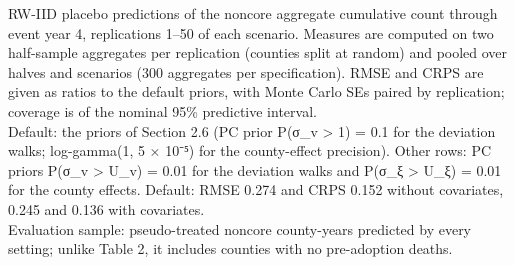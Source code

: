 \begin{table}
\begin{minipage}{\linewidth}
RW-IID placebo predictions of the noncore aggregate cumulative count through event year 4, replications 1–50 of each scenario. Measures are computed on two half-sample aggregates per replication (counties split at random) and pooled over halves and scenarios (300 aggregates per specification). RMSE and CRPS are given as ratios to the default priors, with Monte Carlo SEs paired by replication; coverage is of the nominal 95\% predictive interval.\\
Default: the priors of Section 2.6 (PC prior P(σ\_v > 1) = 0.1 for the deviation walks; log-gamma(1, 5 × 10⁻⁵) for the county-effect precision). Other rows: PC priors P(σ\_v > U\_v) = 0.01 for the deviation walks and P(σ\_ξ > U\_ξ) = 0.01 for the county effects. Default: RMSE 0.274 and CRPS 0.152 without covariates, 0.245 and 0.136 with covariates.\\
Evaluation sample: pseudo-treated noncore county-years predicted by every setting; unlike Table 2, it includes counties with no pre-adoption deaths.\\
\end{minipage}
\end{table}

